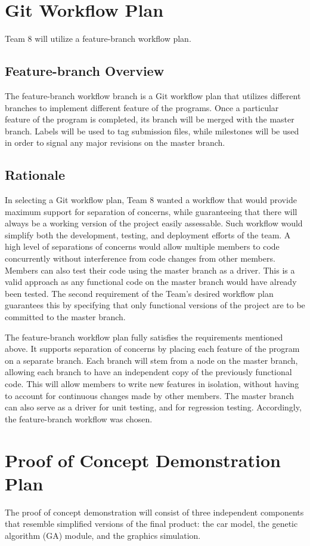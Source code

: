 \documentclass{article}
\begin{document}
\section{Git Workflow Plan}
Team 8 will utilize a feature-branch workflow plan. 

\subsection{Feature-branch Overview}
The feature-branch workflow branch is a Git workflow plan that utilizes 
different branches to implement different feature of the programs. Once a 
particular feature of the program is completed, its branch will be merged with 
the master branch. Labels will be used to tag submission files, while milestones 
will be used in order to signal any major revisions on the master branch.

\subsection{Rationale}
In selecting a Git workflow plan, Team 8 wanted a workflow that would provide 
maximum support for separation of concerns, while guaranteeing that there will 
always be a working version of the project easily assessable. Such workflow 
would simplify both the development, testing, and deployment efforts of the 
team. A high level of separations of concerns would allow multiple members to 
code concurrently without interference from code changes from other members. 
Members can also test their code using the master branch as a driver. This is a 
valid approach as any functional code on the master branch would have already 
been tested. The second requirement of the Team's desired workflow plan 
guarantees this by specifying that only functional versions of the project are 
to be committed to the master branch. 

The feature-branch workflow plan fully satisfies the requirements mentioned 
above. It supports separation of concerns by placing each feature of the program 
on a separate branch. Each branch will stem from a node on the master branch, 
allowing each branch to have an independent copy of the previously functional 
code. This will allow members to write new features in isolation, without having 
to account for continuous changes made by other members. The master branch can 
also serve as a driver for unit testing, and for regression testing. 
Accordingly, the feature-branch workflow was chosen.

\section{Proof of Concept Demonstration Plan}
The proof of concept demonstration will consist of three independent components 
that resemble simplified versions of the final product: the car model, the 
genetic algorithm (GA) module, and the graphics simulation. 
\end{document}
